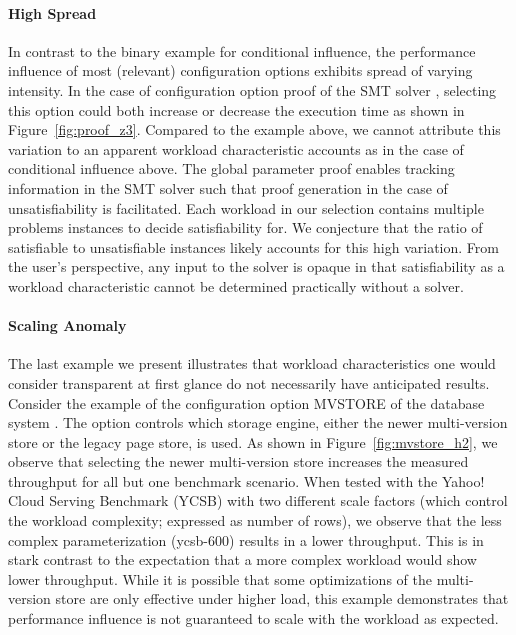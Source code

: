 {{{{\paragraph{High Spread} In contrast to the binary example for conditional influence, the performance influence of most (relevant) configuration options exhibits spread of varying intensity. In the case of configuration option \textsf{proof} of the SMT solver \zdrei, selecting this option could both increase or decrease the execution time as shown in Figure~\ref{fig:proof_z3}. Compared to the example above, we cannot attribute this variation to an apparent workload characteristic accounts as in the case of conditional influence above. 
The global parameter \textsf{proof} enables tracking information in the SMT solver such that proof generation in the case of unsatisfiability is facilitated. Each workload in our selection contains multiple problems instances to decide satisfiability for. We conjecture that the ratio of satisfiable to unsatisfiable instances likely accounts for this high variation. From the user's perspective, any input to the solver is opaque in that satisfiability as a workload characteristic cannot be determined practically without a solver. 

\paragraph{Scaling Anomaly} The last example we present illustrates that workload characteristics one would consider transparent at first glance do not necessarily have anticipated results. Consider the example of the configuration option \textsf{MVSTORE} of the database system \htwo. The option controls which storage engine, either the newer multi-version store or the legacy page store, is used. As shown in Figure~\ref{fig:mvstore_h2}, we observe that selecting the newer multi-version store increases the measured throughput for all but one benchmark scenario. When tested with the Yahoo! Cloud Serving Benchmark (YCSB) with two different scale factors (which control the workload complexity; expressed as number of rows), we observe that the less complex parameterization (ycsb-600) results in a lower throughput. This is in stark contrast to the expectation that a more complex workload would show lower throughput. While it is possible that some optimizations of the multi-version store are only effective under higher load, this example demonstrates that performance influence is not guaranteed to scale with the workload as expected.  

}}}}
